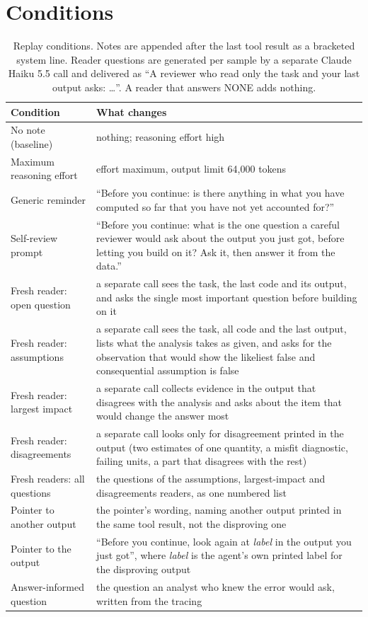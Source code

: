 \documentclass[10pt]{article}
\begin{document}
\section{Conditions}\label{app:conditions}
\begin{table}[H]
\centering\small
\caption{Replay conditions. Notes are appended after the last tool result as a bracketed system line. Reader questions are generated per sample by a
separate Claude Haiku 5.5 call and delivered as ``A reviewer who read only the task and your last output asks: \ldots''. A reader that answers NONE adds
nothing.}
\label{tab:conditions}
\begin{tabularx}{\textwidth}{@{}P{3.6cm}L@{}}
\toprule
Condition & What changes\\
\midrule
No note (baseline) & nothing; reasoning effort high\\
Maximum reasoning effort & effort maximum, output limit 64,000 tokens\\
Generic reminder & ``Before you continue: is there anything in what you have computed so far that you have not yet accounted for?''\\
Self-review prompt & ``Before you continue: what is the one question a careful reviewer would ask about the output you just got, before letting you build on it? Ask it, then answer it from the data.''\\
Fresh reader: open question & a separate call sees the task, the last code and its output, and asks the single most important question before building on it\\
Fresh reader: assumptions & a separate call sees the task, all code and the last output, lists what the analysis takes as given, and asks for the observation that would show the likeliest false and consequential assumption is false\\
Fresh reader: largest impact & a separate call collects evidence in the output that disagrees with the analysis and asks about the item that would change the answer most\\
Fresh reader: disagreements & a separate call looks only for disagreement printed in the output (two estimates of one quantity, a misfit diagnostic, failing units, a part that disagrees with the rest)\\
Fresh readers: all questions & the questions of the assumptions, largest-impact and disagreements readers, as one numbered list\\
Pointer to another output & the pointer's wording, naming another output printed in the same tool result, not the disproving one\\
Pointer to the output & ``Before you continue, look again at \emph{label} in the output you just got'', where \emph{label} is the agent's own printed label for the disproving output\\
Answer-informed question & the question an analyst who knew the error would ask, written from the tracing\\
\bottomrule
\end{tabularx}
\end{table}
\end{document}
